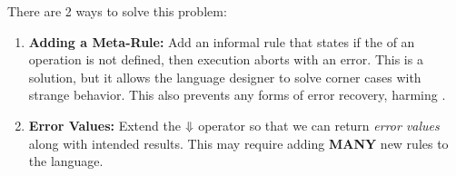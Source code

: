 There are 2 ways to solve this problem:
\begin{enumerate}[noitemsep]
\item \textbf{Adding a Meta-Rule:} Add an informal rule that states if the  of an operation is not defined, then execution aborts with an error.
  This is a solution, but it allows the language designer to solve corner cases with strange behavior.
  This also prevents any forms of error recovery, harming .
\item \textbf{Error Values:} Extend the $\operatorname{\Downarrow}$  operator so that we can return \emph{error values} along with intended results.
  This may require adding \textbf{MANY} new rules to the language.
\end{enumerate}

